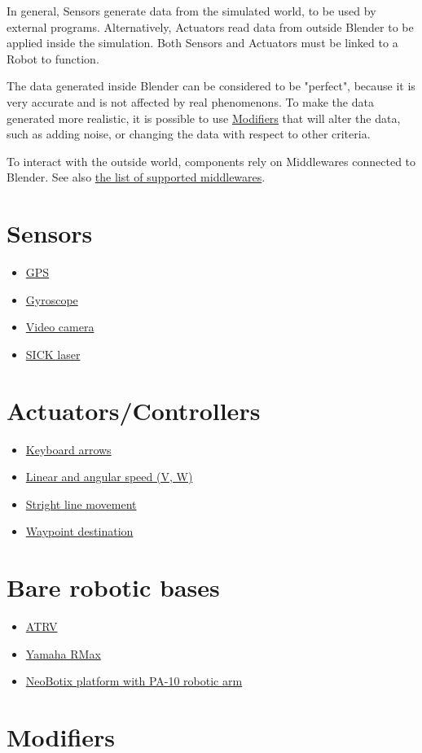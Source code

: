 \documentclass[twoside,a4paper,10pt]{report}
\newcommand{\dokutitleleveltwo}[1]{\section{#1}}
\newcommand{\dokuitem}{\item}
\begin{document}
In general, Sensors generate data from the simulated world, to be used by external programs. Alternatively, Actuators read data from outside Blender to be applied inside the simulation. Both Sensors and Actuators must be linked to a Robot to function.

The data generated inside Blender can be considered to be "perfect", because it is very accurate and is not affected by real phenomenons. To make the data generated more realistic, it is possible to use \hyperref[bf24b44a8cc99e648657b164c8aba758]{ Modifiers} that will alter the data, such as adding noise, or changing the data with respect to other criteria.

To interact with the outside world, components rely on Middlewares connected to Blender. See also \hyperref[9a05db9c4b60b0527010fd997682f523]{ the list of supported middlewares}.


\dokutitleleveltwo{Sensors}
\label{029aee483db9ae244d7a5cb353e74602}%

\begin{itemize}
\dokuitem  \hyperref[11648e4e66e7ed6a86cb7f1d0cf604fe]{ GPS}
\dokuitem  \hyperref[6b3b2d8500522343e080755f0e0aa4fe]{ Gyroscope}
\dokuitem  \hyperref[dd6d2dcc679d12b9430a9787bab45b33]{ Video camera}
\dokuitem  \hyperref[8d7d5ffd0031f2449cbeaef424c22d75]{ SICK laser}
\end{itemize}

\dokutitleleveltwo{Actuators/Controllers}
\label{2068e59180763f350d66a42e828e7f96}%

\begin{itemize}
\dokuitem  \hyperref[388a56dbb62a010dc26a378981346247]{ Keyboard arrows}
\dokuitem  \hyperref[cdf7afd8bc8dbb764b14c987cea8effd]{ Linear and angular speed (V, W)}
\dokuitem  \hyperref[6990a54322d9232390a784c5c9247dd6]{ Stright line movement}
\dokuitem  \hyperref[f75862c2bd0040eb683048c313dcaaa8]{ Waypoint destination}
\end{itemize}

\dokutitleleveltwo{Bare robotic bases}
\label{d69ac14cd721dd995822d4e984f48116}%

\begin{itemize}
\dokuitem  \hyperref[4fd87f5742582d412dce2c6ad5304937]{ ATRV}
\dokuitem  \hyperref[311954cf2f831f2289fb7fff75d15a7d]{ Yamaha RMax}
\dokuitem  \hyperref[3c16132d99703978dacd02b0808a4270]{ NeoBotix platform with PA-10 robotic arm}
\end{itemize}

\dokutitleleveltwo{Modifiers}
\label{bf24b44a8cc99e648657b164c8aba758}%
\end{document}
